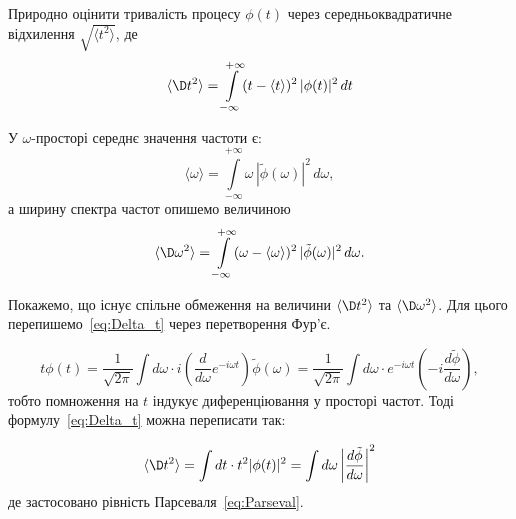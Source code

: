 Природно оцінити тривалість процесу $\phi(t)$ через середньоквадратичне відхилення $\sqrt{\langle t^2 \rangle}$, де
\begin{equation}\label{eq:Delta_t}
	\langle \D t^2 \rangle
	= \int\limits_{-\infty}^{+\infty} (t - \langle t \rangle)^2\, |\phi(t)|^2\, dt
\end{equation}

У $\omega$-просторі середнє значення частоти є:
\begin{equation*}
	\langle \omega \rangle = \int\limits_{-\infty}^{+\infty}
	\omega\, |\tilde{\phi}(\omega)|^2\, d\omega,
\end{equation*}
а ширину спектра частот опишемо величиною
\begin{equation}\label{eq:Delta_omega}
	\langle \D\omega^2 \rangle
	= \int\limits_{-\infty}^{+\infty}
	(\omega - \langle\omega\rangle)^2\, |\tilde{\phi}(\omega)|^2\, d\omega.
\end{equation}

Покажемо, що існує спільне обмеження на величини $\langle \D t^2 \rangle$ та $\langle \D\omega^2 \rangle$. Для
цього перепишемо~\eqref{eq:Delta_t} через перетворення Фур'є.

\begin{equation*}
	t \phi(t) = \frac{1}{\sqrt{2\pi}} \int d\omega \cdot i \left(\frac{d}{d\omega}e^{-i\omega t}\right) \tilde\phi(\omega) = \frac{1}{\sqrt{2\pi}} \int d\omega \cdot
	e^{-i\omega t} \left( -i \frac{d\tilde\phi}{d\omega} \right),
\end{equation*}
тобто помноження на \( t \) індукує диференціювання у просторі частот. Тоді формулу~\eqref{eq:Delta_t} можна переписати
так:

\begin{equation}
	\langle \D t^2 \rangle =
	\int dt \cdot t^2 |\phi(t)|^2  =
	\int d\omega \left| \frac{d\tilde{\phi}}{d\omega} \right|^2
	\label{eq:time_duration_fourier}
\end{equation}
%
де застосовано рівність Парсеваля~\eqref{eq:Parseval}.

